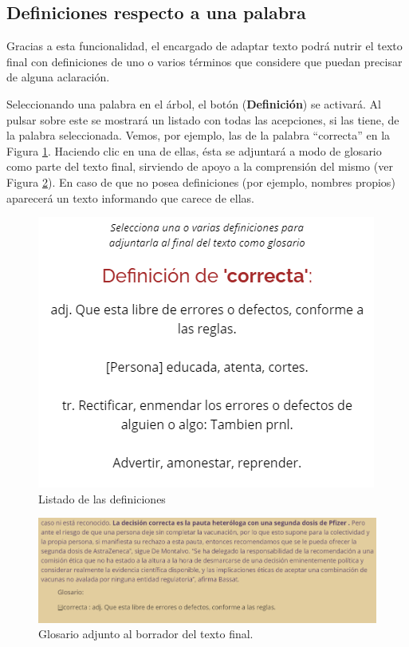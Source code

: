 \subsection{Definiciones respecto a una palabra}
 Gracias a esta funcionalidad, el encargado de adaptar texto podrá nutrir el texto final con definiciones de uno o varios términos que considere que puedan precisar de alguna aclaración. 
 
 Seleccionando una palabra en el árbol, el botón (\textbf{Definición}) se activará. Al pulsar sobre este se mostrará un listado con todas las acepciones, si las tiene, de la palabra seleccionada. Vemos, por ejemplo, las de la palabra ``correcta'' en la Figura \ref{fig:definiciones}. Haciendo clic en una de ellas, ésta se adjuntará a modo de glosario como parte del texto final, sirviendo de apoyo a la comprensión del mismo (ver Figura \ref{fig:definicionesBorrador}). En caso de que no posea definiciones (por ejemplo, nombres propios) aparecerá un texto informando que carece de ellas.
 	 \begin{figure}[h!]
 	\centering
 	
 	
 	\includegraphics[scale=0.8]{Imagenes/Figuras/DefinicionesPersonas}
 	
 	
 	\caption{Listado de las definiciones}
 	\label{fig:definiciones}
 \end{figure}
 	 \begin{figure}[h!]
	\centering
	
	
	\includegraphics[scale=0.8]{Imagenes/Figuras/GlosarioBorrador}
	
	
	\caption{Glosario adjunto al borrador del texto final.}
	\label{fig:definicionesBorrador}
\end{figure}
